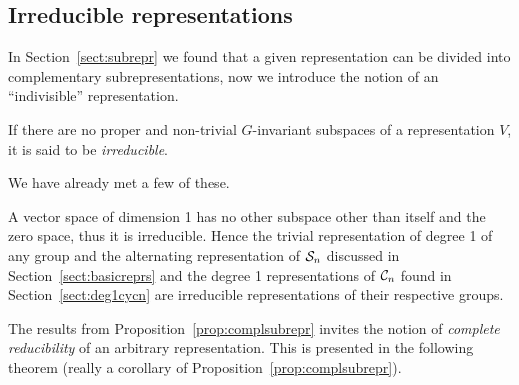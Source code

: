 \subsection{Irreducible representations}\label{sect:irredreprs}

In Section~\ref{sect:subrepr} we found that a given representation can be divided into complementary subrepresentations, now we introduce the notion of an ``indivisible'' representation.

\begin{definition}
	If there are no proper and non-trivial $G$-invariant subspaces of a representation $V$, it is said to be \textit{irreducible}. 
\end{definition}

We have already met a few of these.

\begin{example}\cite[Example 1.4.2.]{Sagan}
	A vector space of dimension 1 has no other subspace other than itself and the zero space, thus it is irreducible. Hence the trivial representation of degree 1 of any group and the alternating representation of $\mathcal{S}_n$ discussed in Section~\ref{sect:basicreprs} and the degree 1 representations of $\mathcal{C}_n$ found in Section~\ref{sect:deg1cycn} are irreducible representations of their respective groups.
\end{example}

The results from Proposition~\ref{prop:complsubrepr} invites the notion of \textit{complete reducibility} of an arbitrary representation. This is presented in the following theorem (really a corollary of Proposition~\ref{prop:complsubrepr}).

